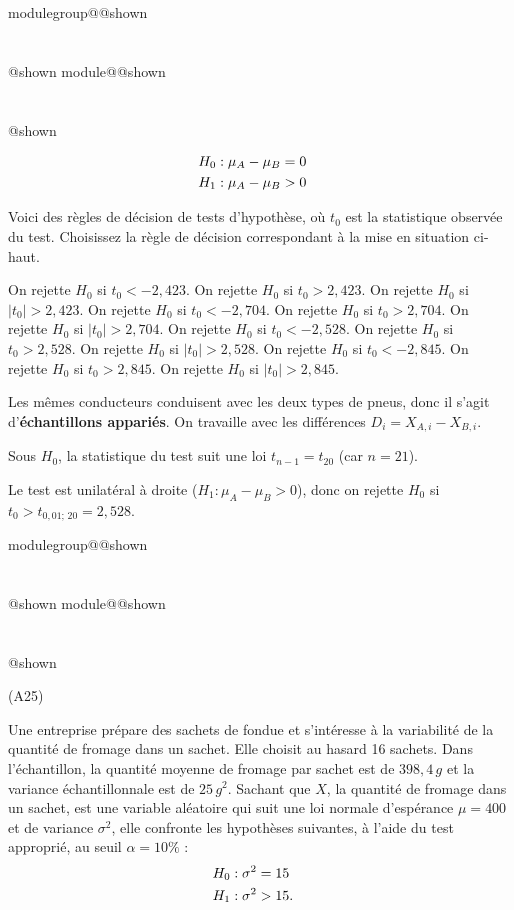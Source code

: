 \documentclass{Evaluation}
\makeatletter
\newcommand{\currentmodulekey}{}
\newcommand{\currentmoduletitle}{}
\newcommand{\currentgroupkey}{}
\newcommand{\currentgrouptitle}{}
\newcommand{\showmoduleifneeded}{%
  \ifx\currentgroupkey\empty\else
    \expandafter\ifx\csname modulegroup@\currentgroupkey @shown\endcsname\relax
      \section*{\currentgrouptitle}%
      \expandafter\gdef\csname modulegroup@\currentgroupkey @shown\endcsname{1}%
    \fi
  \fi
  \expandafter\ifx\csname module@\currentmodulekey @shown\endcsname\relax
    \section*{\currentmoduletitle}%
    \expandafter\gdef\csname module@\currentmodulekey @shown\endcsname{1}%
  \fi
}
\newenvironment{A25}{\showmoduleifneeded}{}
\makeatother
\begin{document}
\begin{questions}
\begin{A25}
\begin{align*}
    H_0&:\mu_{A} - \mu_{B} = 0 \cr
    H_1&:\mu_{A} - \mu_{B} > 0
\end{align*}

Voici des règles de décision de tests d'hypothèse, où $t_0$ est la statistique observée du test. Choisissez la règle de décision correspondant à la mise en situation ci-haut.

\begin{checkboxes}
    \choice On rejette $H_0$ si $t_0 < -2,423$.
    \choice On rejette $H_0$ si $t_0 > 2,423$.
    \choice On rejette $H_0$ si $|t_0| > 2,423$.
    \choice On rejette $H_0$ si $t_0 < -2,704$.
    \choice On rejette $H_0$ si $t_0 > 2,704$.
    \choice On rejette $H_0$ si $|t_0| > 2,704$.
    \choice On rejette $H_0$ si $t_0 < -2,528$.
    \correctchoice On rejette $H_0$ si $t_0 > 2,528$.
    \choice On rejette $H_0$ si $|t_0| > 2,528$.
    \choice On rejette $H_0$ si $t_0 < -2,845$.
    \choice On rejette $H_0$ si $t_0 > 2,845$.
    \choice On rejette $H_0$ si $|t_0| > 2,845$.
\end{checkboxes}

\begin{solution}
Les mêmes conducteurs conduisent avec les deux types de pneus, donc il s'agit d'\textbf{échantillons appariés}. On travaille avec les différences $D_i = X_{A,i} - X_{B,i}$.

Sous $H_0$, la statistique du test suit une loi $t_{n-1} = t_{20}$ (car $n = 21$).

Le test est unilatéral à droite ($H_1 : \mu_A - \mu_B > 0$), donc on rejette $H_0$ si $t_0 > t_{0{,}01;\,20} = 2{,}528$.
\end{solution}
\end{A25}

\begin{A25}
\question\label{1FQCM} (A25)

Une entreprise prépare des sachets de fondue et s'intéresse à la variabilité de la quantité de fromage dans un sachet. Elle choisit au hasard 16 sachets. Dans l'échantillon, la quantité moyenne de fromage par sachet est de $398,4 \,g$ et la variance échantillonnale est de $25 \, g^2$. Sachant que $X$, la quantité de fromage dans un sachet, est une variable aléatoire qui suit une loi normale d'espérance $\mu=400$ et de variance $\sigma^2$, elle confronte les hypothèses suivantes, à l'aide du test approprié, au seuil $\alpha=10\%$ :
\begin{align*}
	H_0 &: \sigma^2 = 15 \cr
	H_1 &: \sigma^2 > 15.
\end{align*}


\end{A25}
\end{questions}
\end{document}
